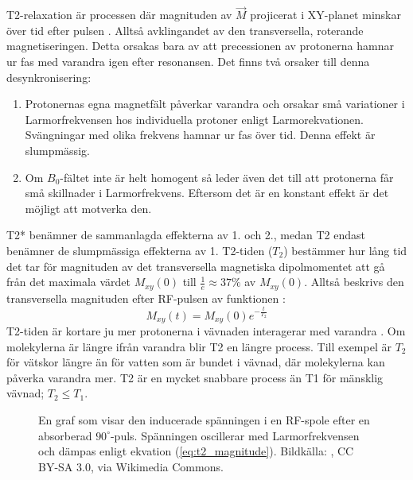 \documentclass[11pt, a4paper]{article}
\begin{document}
T2-relaxation är processen där magnituden av $\vec{M}$ projicerat i XY-planet minskar över tid efter pulsen \parencite{understanding_mri}. Alltså avklingandet av den transversella, roterande magnetiseringen. Detta orsakas bara av att precessionen av protonerna hamnar ur fas med varandra igen efter resonansen. Det finns två orsaker till denna desynkronisering:
\begin{enumerate}
	\item Protonernas egna magnetfält påverkar varandra och orsakar små variationer i Larmorfrekvensen hos individuella protoner enligt Larmorekvationen. Svängningar med olika frekvens hamnar ur fas över tid. Denna effekt är slumpmässig.
	\item Om $B_0$-fältet inte är helt homogent så leder även det till att protonerna får små skillnader i Larmorfrekvens. Eftersom det är en konstant effekt är det möjligt att motverka den.
\end{enumerate}
T2* benämner de sammanlagda effekterna av 1. och 2., medan T2 endast benämner de slumpmässiga effekterna av 1. T2-tiden ($T_2$) bestämmer hur lång tid det tar för magnituden av det transversella magnetiska dipolmomentet att gå från det maximala värdet $M_{xy}(0)$ till $\frac{1}{e}\approx37\%$ av $M_{xy}(0)$. Alltså beskrivs den transversella magnituden efter RF-pulsen av funktionen \parencite[s. 59]{mri_lärobok}:
\begin{equation}\label{eq:t2_magnitude}
	M_{xy}(t)=M_{xy}(0)e^{-\frac{t}{T_2}}
\end{equation}
T2-tiden är kortare ju mer protonerna i vävnaden interagerar med varandra \parencite{understanding_mri}. Om molekylerna är längre ifrån varandra blir T2 en längre process. Till exempel är $T_2$ för vätskor längre än för vatten som är bundet i vävnad, där molekylerna kan påverka varandra mer. T2 är en mycket snabbare process än T1 för mänsklig vävnad; $T_2\leq T_1$.

\begin{figure}[hb]
	\centering
	
	\caption{En graf som visar den inducerade spänningen i en RF-spole efter en absorberad $90^\circ$-puls. Spänningen oscillerar med Larmorfrekvensen och dämpas enligt ekvation (\ref{eq:t2_magnitude}). Bildkälla: \textcite{fig:fid}, CC BY-SA 3.0, via Wikimedia Commons.}
	\label{fig:fid}
\end{figure}
\end{document}
